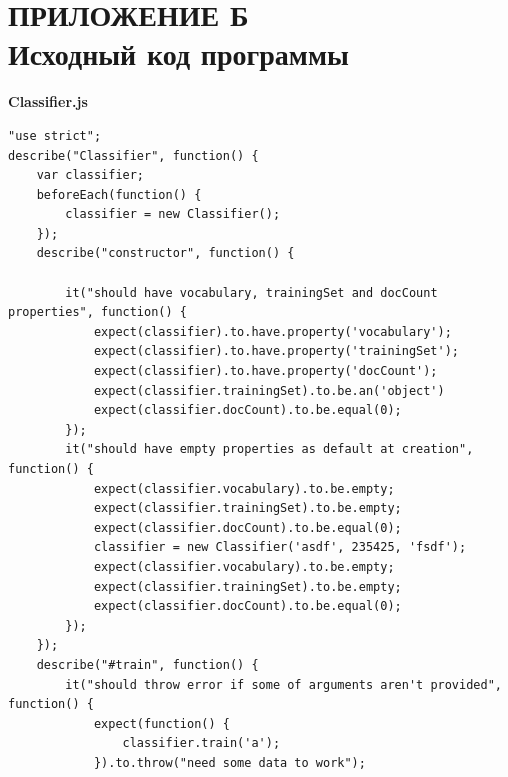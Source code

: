 \documentclass[14pt,a4paper]{extreport}
\begin{document}
	\section*{\center\normalsize ПРИЛОЖЕНИЕ Б\\Исходный код программы \endcenter}
    \par \textbf{Classifier.js}
	\begin{verbatim}
"use strict";
describe("Classifier", function() {
	var classifier;
	beforeEach(function() {
		classifier = new Classifier();
	});
	describe("constructor", function() {

		it("should have vocabulary, trainingSet and docCount properties", function() {
			expect(classifier).to.have.property('vocabulary');
			expect(classifier).to.have.property('trainingSet');
			expect(classifier).to.have.property('docCount');
			expect(classifier.trainingSet).to.be.an('object')
			expect(classifier.docCount).to.be.equal(0);
		});
		it("should have empty properties as default at creation", function() {
			expect(classifier.vocabulary).to.be.empty;
			expect(classifier.trainingSet).to.be.empty;
			expect(classifier.docCount).to.be.equal(0);
			classifier = new Classifier('asdf', 235425, 'fsdf');
			expect(classifier.vocabulary).to.be.empty;
			expect(classifier.trainingSet).to.be.empty;
			expect(classifier.docCount).to.be.equal(0);
		});
	});
	describe("#train", function() {
		it("should throw error if some of arguments aren't provided", function() {
			expect(function() {
				classifier.train('a');
			}).to.throw("need some data to work");


\end{verbatim}
\end{document}
